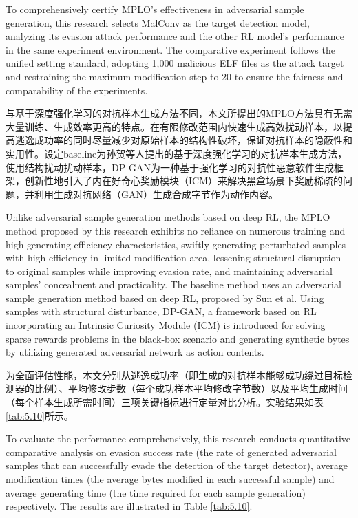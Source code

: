 To comprehensively certify MPLO's effectiveness in adversarial sample generation, this research selects MalConv\cite{raff2017malware} as the target detection model, analyzing its evasion attack performance and the other RL model's performance in the same experiment environment. The comparative experiment follows the unified setting standard, adopting 1,000 malicious ELF files as the attack target and restraining the maximum modification step to 20 to ensure the fairness and comparability of the experiments.

与基于深度强化学习的对抗样本生成方法不同，本文所提出的MPLO方法具有无需大量训练、生成效率更高的特点。在有限修改范围内快速生成高效扰动样本，以提高逃逸成功率的同时尽量减少对原始样本的结构性破坏，保证对抗样本的隐蔽性和实用性。设定baseline为孙贺\cite{孙贺2024基于深度强化学习的恶意}等人提出的基于深度强化学习的对抗样本生成方法，使用结构扰动扰动样本，DP-GAN\cite{zhan2024enhancing}为一种基于强化学习的对抗性恶意软件生成框架，创新性地引入了内在好奇心奖励模块（ICM）来解决黑盒场景下奖励稀疏的问题，并利用生成对抗网络（GAN）生成合成字节作为动作内容。

Unlike adversarial sample generation methods based on deep RL, the MPLO method proposed by this research exhibits no reliance on numerous training and high generating efficiency characteristics, swiftly generating perturbated samples with high efficiency in limited modification area, lessening structural disruption to original samples while improving evasion rate, and maintaining adversarial samples' concealment and practicality. The baseline method uses an adversarial sample generation method based on deep RL, proposed by Sun et al\cite{孙贺2024基于深度强化学习的恶意}. Using samples with structural disturbance, DP-GAN\cite{zhan2024enhancing}, a framework based on RL incorporating an Intrinsic Curiosity Module (ICM) is introduced for solving sparse rewards problems in the black-box scenario and generating synthetic bytes by utilizing generated adversarial network as action contents.

为全面评估性能，本文分别从逃逸成功率（即生成的对抗样本能够成功绕过目标检测器的比例）、平均修改步数（每个成功样本平均修改字节数）以及平均生成时间（每个样本生成所需时间）三项关键指标进行定量对比分析。实验结果如表\ref{tab:5.10}所示。

To evaluate the performance comprehensively, this research conducts quantitative comparative analysis on evasion success rate (the rate of generated adversarial samples that can successfully evade the detection of the target detector), average modification times (the average bytes modified in each successful sample) and average generating time (the time required for each sample generation) respectively. The results are illustrated in Table \ref{tab:5.10}.


